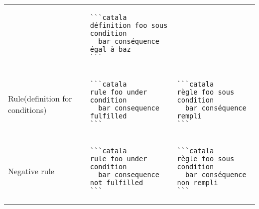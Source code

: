 \documentclass[a3paper,landscape]{article}
\begin{document}
\begin{multicols*}{2}
\begin{center}
\begin{tabular}{p{}p{}p{}}
&
\vspace*{-1.7em}
\begin{verbatim}
```catala
définition foo sous condition
  bar conséquence égal à baz
```
\end{verbatim}
\vspace*{-1.7em}
\\
Rule\newline(definition for conditions)&
\vspace*{-1.7em}
\begin{verbatim}
```catala
rule foo under condition
  bar consequence fulfilled
```
\end{verbatim}
\vspace*{-1.7em}
&
\vspace*{-1.7em}
\begin{verbatim}
```catala
règle foo sous condition
  bar conséquence rempli
```
\end{verbatim}
\vspace*{-1.7em}
\\
Negative rule&
\vspace*{-1.7em}
\begin{verbatim}
```catala
rule foo under condition
  bar consequence not fulfilled
```
\end{verbatim}
\vspace*{-1.7em}
&
\vspace*{-1.7em}
\begin{verbatim}
```catala
règle foo sous condition
  bar conséquence non rempli
```
\end{verbatim}
\vspace*{-1.7em}
\\
\bottomrule
\end{tabular}
\end{center}

\end{multicols*}
\end{document}
